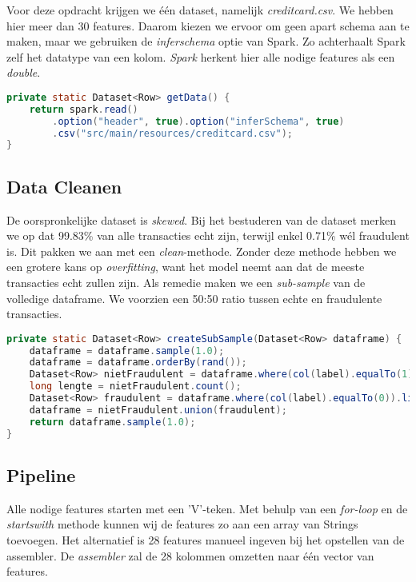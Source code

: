 \documentclass[a4paper,10pt,twoside]{report}
\begin{document}
Voor deze opdracht krijgen we één dataset, namelijk \textit{creditcard.csv}. We hebben hier meer dan 30 features. Daarom kiezen we ervoor om geen apart schema aan te maken, maar we gebruiken de \textit{inferschema} optie van Spark. Zo achterhaalt Spark zelf het datatype van een kolom. \textit{Spark} herkent hier alle nodige features als een \textit{double}.

\begin{lstlisting}[language=Java]
private static Dataset<Row> getData() {
	return spark.read()
		.option("header", true).option("inferSchema", true)
		.csv("src/main/resources/creditcard.csv");
}
\end{lstlisting}

\subsection*{Data Cleanen}

De oorspronkelijke dataset is \textit{skewed}. Bij het bestuderen van de dataset merken we op dat 99.83\% van alle transacties echt zijn, terwijl enkel 0.71\% wél fraudulent is. Dit pakken we aan met een \textit{clean}-methode. Zonder deze methode hebben we een grotere kans op \textit{overfitting}, want het model neemt aan dat de meeste transacties echt zullen zijn. Als remedie maken we een \textit{sub-sample} van de volledige dataframe. We voorzien een 50:50 ratio tussen echte en fraudulente transacties.

\begin{lstlisting}[language=Java]
private static Dataset<Row> createSubSample(Dataset<Row> dataframe) {
	dataframe = dataframe.sample(1.0);
	dataframe = dataframe.orderBy(rand());
	Dataset<Row> nietFraudulent = dataframe.where(col(label).equalTo(1));
	long lengte = nietFraudulent.count();
	Dataset<Row> fraudulent = dataframe.where(col(label).equalTo(0)).limit((int) lengte);
	dataframe = nietFraudulent.union(fraudulent);
	return dataframe.sample(1.0);
}
\end{lstlisting}

\subsection*{Pipeline}

Alle nodige features starten met een 'V'-teken. Met behulp van een \textit{for-loop} en de \textit{startswith} methode kunnen wij de features zo aan een array van Strings toevoegen. Het alternatief is 28 features manueel ingeven bij het opstellen van de assembler. De \textit{assembler} zal de 28 kolommen omzetten naar één vector van features.
\end{document}
